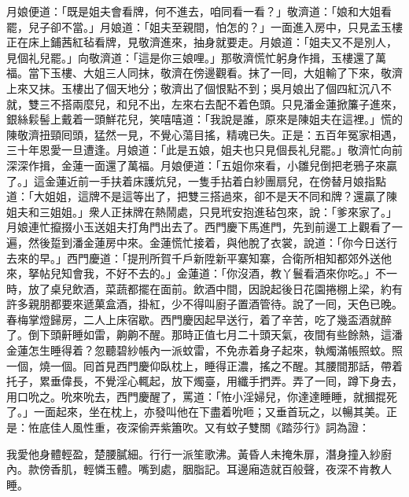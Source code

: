 月娘便道：「既是姐夫會看牌，何不進去，咱同看一看？」{}敬濟道：「娘和大姐看罷，兒子卻不當。」{}月娘道：「姐夫至親間，怕怎的？」一面進入房中，只見孟玉樓正在床上鋪茜紅毡看牌，見敬濟進來，抽身就要走。月娘道：「姐夫又不是別人，見個礼兒罷。」{}向敬濟道：「這是你三娘哩。」那敬濟慌忙躬身作揖，玉樓還了萬福。當下玉樓、大姐三人同抹，敬濟在傍邊觀看。抹了一囘，大姐輸了下來，敬濟上來又抹。玉樓出了個天地分；敬濟出了個恨點不到；吳月娘出了個四紅沉八不就，雙三不搭兩麼兒，和兒不出，左來右去配不着色頭。只見潘金蓮掀簾子進來，銀絲鬏髻上戴着一頭鮮花兒，{}笑嘻嘻道：「我說是誰，原來是陳姐夫在這裡。」{}慌的陳敬濟扭頸囘頭，猛然一見，不覺心蕩目搖，精魂已失。正是：五百年冤家相遇，三十年恩愛一旦遭逢。月娘道：「此是五娘，姐夫也只見個長礼兒罷。」敬濟忙向前深深作揖，金蓮一面還了萬福。月娘便道：「五姐你來看，小雛兒倒把老鴉子來贏了。」這金蓮近前一手扶着床護炕兒，一隻手拈着白紗團扇兒，在傍替月娘指點道：「大姐姐，這牌不是這等出了，把雙三搭過來，卻不是天不同和牌？還贏了陳姐夫和三姐姐。」衆人正抹牌在熱鬧處，只見玳安抱進毡包來，說：「爹來家了。」月娘連忙攛掇小玉送姐夫打角門出去了。{}西門慶下馬進門，先到前邊工上觀看了一遍，然後踅到潘金蓮房中來。金蓮慌忙接着，與他脫了衣裳，說道：「你今日送行去來的早。」西門慶道：「提刑所賀千戶新陞新平寨知寨，合衛所相知都郊外送他來，拏帖兒知會我，不好不去的。」金蓮道：「你沒酒，教丫鬟看酒來你吃。」不一時，放了桌兒飲酒，菜蔬都擺在面前。飲酒中間，因說起後日花園捲棚上梁，約有許多親朋都要來遞菓盒酒，掛紅，少不得叫廚子置酒管待。說了一囘，天色已晚。春梅掌燈歸房，二人上床宿歇。西門慶因起早送行，着了辛苦，吃了幾盃酒就醉了。倒下頭鼾睡如雷，齁齁不醒。那時正值七月二十頭天氣，夜間有些餘熱，這潘金蓮怎生睡得着？忽聽碧紗帳內一派蚊雷，不免赤着身子起來，執燭滿帳照蚊。照一個，燒一個。囘首見西門慶仰臥枕上，睡得正濃，搖之不醒。其腰間那話，帶着托子，累垂偉長，不覺淫心輒起，放下燭臺，用纖手捫弄。{}弄了一囘，蹲下身去，用口吮之。吮來吮去，西門慶醒了，罵道：「恠小淫婦兒，你達達睡睡，就摑掍死了。」一面起來，坐在枕上，亦發叫他在下盡着吮咂；又垂首玩之，以暢其美。正是：恠底佳人風性重，夜深偷弄紫簫吹。又有蚊子雙關《踏莎行》詞為證：

\begin{myquote}
我愛他身體輕盈，楚腰膩細。行行一派笙歌沸。黃昏人未掩朱扉，潛身撞入紗廚內。款傍香肌，輕憐玉體。嘴到處，胭脂記。耳邊廂造就百般聲，夜深不肯教人睡。
\end{myquote}

